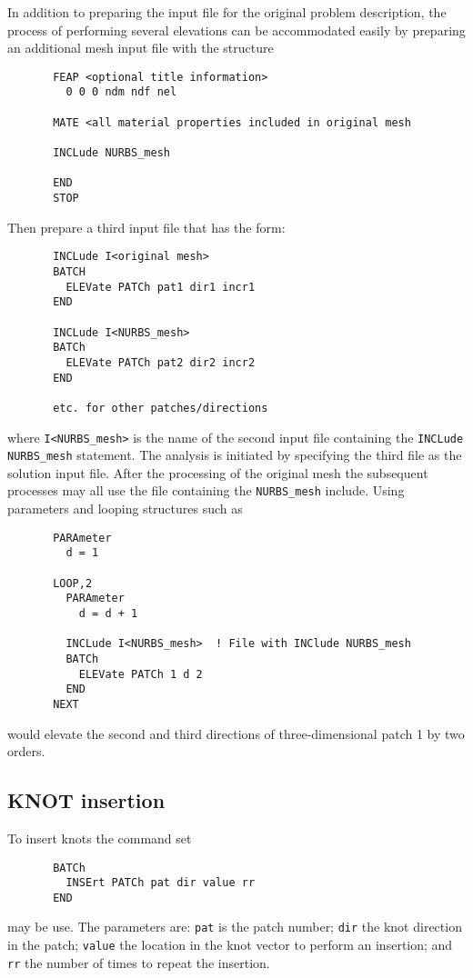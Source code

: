 In addition to preparing the input file for the original problem
description,
the process of performing several elevations can be accommodated easily by
preparing an additional mesh input file with the structure
\begin{verbatim}
       FEAP <optional title information>
         0 0 0 ndm ndf nel

       MATE <all material properties included in original mesh

       INCLude NURBS_mesh

       END
       STOP
\end{verbatim}
Then prepare a third input file that has the form:
\begin{verbatim}
       INCLude I<original mesh>
       BATCH
         ELEVate PATCh pat1 dir1 incr1
       END

       INCLude I<NURBS_mesh>
       BATCh
         ELEVate PATCh pat2 dir2 incr2
       END

       etc. for other patches/directions
\end{verbatim}
where \texttt{I<NURBS\_mesh>} is the name of the second input file containing the
\texttt{INCLude NURBS\_mesh} statement.
The analysis is initiated by specifying the third file as the solution
input file.
After the processing of the original mesh the subsequent processes may all
use the file containing the \texttt{NURBS\_mesh} include.  Using parameters
and looping structures such as
\begin{verbatim}
       PARAmeter
         d = 1

       LOOP,2
         PARAmeter
           d = d + 1

         INCLude I<NURBS_mesh>  ! File with INClude NURBS_mesh
         BATCh
           ELEVate PATCh 1 d 2
         END
       NEXT
\end{verbatim}
would elevate the second and third directions of three-dimensional
patch 1 by two orders.

\subsection{KNOT insertion}

To insert knots the command set
\begin{verbatim}
       BATCh
         INSErt PATCh pat dir value rr
       END
\end{verbatim}
may be use.  The parameters are: \texttt{pat} is the patch number;
\texttt{dir} the knot direction in the patch; \texttt{value} the location
in the knot vector to perform an insertion; and \texttt{rr} the number of
times to repeat the insertion.

